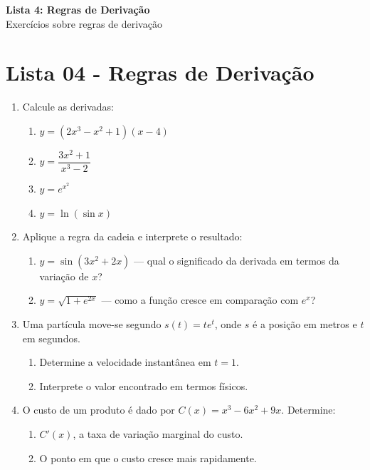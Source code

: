 \documentclass[12pt,a4paper]{article}
\begin{document}
\begin{center}
  {\LARGE\bfseries\color{primary} Lista 4: Regras de Derivação} \\[0.1cm]
  {\small\sffamily\color{gray} Exercícios sobre regras de derivação}
\end{center}

\vspace{0.2cm}


\section*{Lista 04 - Regras de Derivação}

\begin{enumerate}
    \item Calcule as derivadas:
    \begin{enumerate}
        \item $y = (2x^3 - x^2 + 1)(x - 4)$
        \item $y = \dfrac{3x^2 + 1}{x^3 - 2}$
        \item $y = e^{x^2}$
        \item $y = \ln(\sin x)$
    \end{enumerate}

    \item Aplique a regra da cadeia e interprete o resultado:
    \begin{enumerate}
        \item $y = \sin(3x^2 + 2x)$ — qual o significado da derivada em termos da variação de $x$?
        \item $y = \sqrt{1 + e^{2x}}$ — como a função cresce em comparação com $e^x$?
    \end{enumerate}

    \item Uma partícula move-se segundo $s(t) = t e^t$, onde $s$ é a posição em metros e $t$ em segundos.
    \begin{enumerate}
        \item Determine a velocidade instantânea em $t = 1$.
        \item Interprete o valor encontrado em termos físicos.
    \end{enumerate}

    \item O custo de um produto é dado por $C(x) = x^3 - 6x^2 + 9x$. Determine:
    \begin{enumerate}
        \item $C'(x)$, a taxa de variação marginal do custo.
        \item O ponto em que o custo cresce mais rapidamente.
    \end{enumerate}


\end{enumerate}
\end{document}
